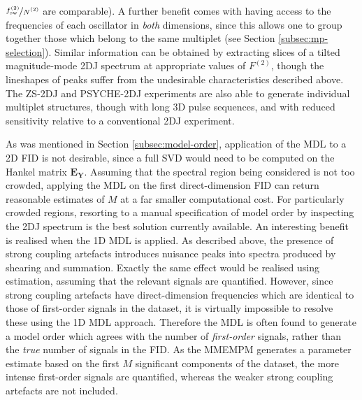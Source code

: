 $\nicefrac{\fswtwo}{\Ntwo}$ are comparable).
A further benefit comes with having access to the frequencies of each
oscillator in \emph{both} dimensions, since this allows one to group together
those which belong to the same multiplet (see Section
\ref{subsec:mp-selection}). Similar information can be obtained
by extracting slices of a tilted magnitude-mode \ac{2DJ} spectrum at
appropriate values of $F^{(2)}$, though the lineshapes of peaks suffer from the
undesirable characteristics described above. The
\ac{ZS}-\ac{2DJ}\cite{Pell2007} and
\ac{PSYCHE}-\ac{2DJ}\cite{Foroozandeh2015,Kiraly2017} experiments are also able
to generate individual multiplet structures, though with long \ac{3D} pulse
sequences, and with reduced sensitivity relative to a conventional \ac{2DJ}
experiment.

As was mentioned in Section \ref{subsec:model-order}, application of the
\ac{MDL} to a \ac{2D} \ac{FID} is not desirable, since a full \ac{SVD} would
need to be computed on the Hankel matrix $\symbf{E}_{\symbf{Y}}$.
Assuming that the spectral region being considered is not too
crowded, applying the \ac{MDL} on the first direct-dimension \ac{FID} can
return reasonable estimates of $M$ at a far smaller computational cost. For
particularly crowded regions, resorting to a manual specification of model
order by inspecting the \ac{2DJ} spectrum is the best solution currently
available.
An interesting benefit is realised when the \ac{1D} \ac{MDL} is applied.
As described above, the presence of strong coupling artefacts introduces
nuisance peaks into spectra produced by shearing and summation. Exactly the
same effect would be realised using estimation, assuming
that the relevant signals are quantified. However, since strong coupling
artefacts have direct-dimension frequencies which are identical to those of
first-order signals in the dataset, it is virtually impossible to resolve these
using the \ac{1D} \ac{MDL} approach. Therefore the \ac{MDL} is often found to
generate a model order which agrees with the number of \emph{first-order} signals,
rather than the \emph{true} number of signals in the \ac{FID}. As the
\ac{MMEMPM} generates a parameter estimate based on the first $M$ significant
components of the dataset, the more intense first-order signals are quantified,
whereas the weaker strong coupling artefacts are not included.

